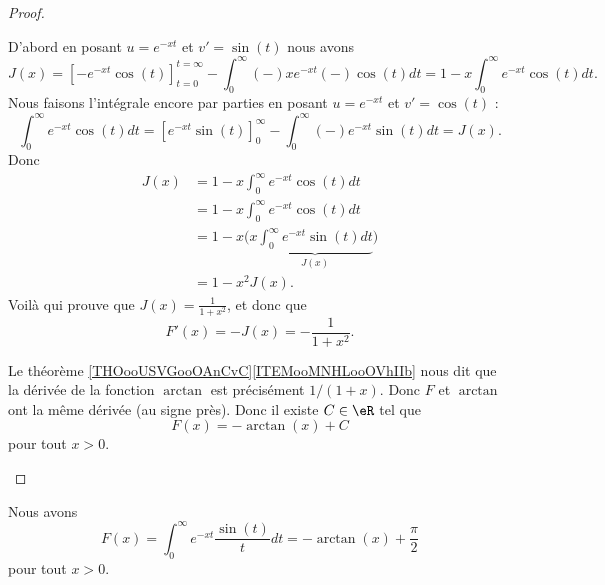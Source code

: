 \begin{proof}
\begin{subproof}
		D'abord en posant \( u= e^{-xt}\) et \( v'=\sin(t)\) nous avons
		\begin{equation}
			J(x)=\left[ - e^{-xt}\cos(t) \right]_{t=0}^{t=\infty}-\int_0^{\infty}(-)x e^{-xt}(-)\cos(t)dt=1-x\int_0^{\infty} e^{-xt}\cos(t)dt.
		\end{equation}
		Nous faisons l'intégrale encore par parties en posant \( u= e^{-xt}\) et \( v'=\cos(t)\) :
		\begin{equation}
			\int_0^{\infty} e^{-xt}\cos(t)dt=\left[  e^{-xt}\sin(t) \right]_0^{\infty}-\int_0^{\infty}(-) e^{-xt}\sin(t)dt=J(x).
		\end{equation}
		Donc
		\begin{subequations}
			\begin{align}
				J(x) & =1-x\int_0^{\infty} e^{-xt}\cos(t)dt                                  \\
				     & =1-x\int_0^{\infty} e^{-xt}\cos(t)dt                                  \\
				     & =1-x\Big( x\underbrace{\int_0^{\infty} e^{-xt}\sin(t)dt}_{J(x)} \Big) \\
				     & =1-x^2J(x).
			\end{align}
		\end{subequations}
		Voilà qui prouve que \( J(x)=\frac{1}{ 1+x^2 }\), et donc que
		\begin{equation}
			F'(x)=-J(x)=-\frac{1}{ 1+x^2 }.
		\end{equation}

		\spitem[Et enfin]

		Le théorème \ref{THOooUSVGooOAnCvC}\ref{ITEMooMNHLooOVhIIb} nous dit que la dérivée de la fonction \( \arctan\) est précisément \( 1/(1+x)\). Donc \( F\) et \( \arctan\) ont la même dérivée (au signe près). Donc il existe \( C\in \eR\) tel que
		\begin{equation}
			F(x)=-\arctan(x)+C
		\end{equation}
		pour tout \( x>0\).

	\end{subproof}
\end{proof}

\begin{lemma}       \label{LEMooEOYHooVIMCCa}
	Nous avons
	\begin{equation}
		F(x)=\int_0^{\infty} e^{-xt}\frac{ \sin(t) }{ t }dt=-\arctan(x)+\frac{ \pi }{2}
	\end{equation}
	pour tout \( x>0\).
\end{lemma}


